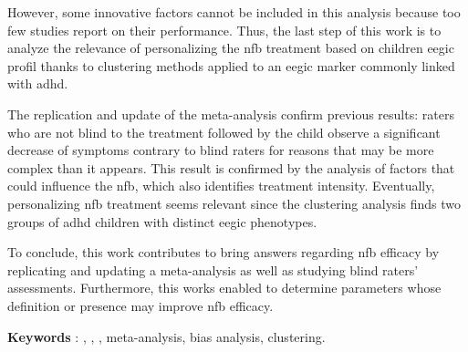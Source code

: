 However, some innovative factors cannot be included in this analysis because too few studies report on their performance.
Thus, the last step of this work is to analyze the relevance of personalizing the \gls{nfb} treatment based on children \gls{eegic} profil
thanks to clustering methods applied to an \gls{eegic} marker commonly linked with \gls{adhd}.

The replication and update of the meta-analysis confirm previous results: raters who are not blind to the treatment
followed by the child observe a significant decrease of symptoms contrary to blind raters for reasons that may be more complex 
than it appears. This result is confirmed by the analysis of factors that could influence the \gls{nfb}, which also identifies 
treatment intensity. Eventually, personalizing \gls{nfb} treatment seems relevant since the clustering analysis finds two groups
of \gls{adhd} children with distinct \gls{eegic} phenotypes. 

To conclude, this work contributes to bring answers regarding \gls{nfb} efficacy by replicating and updating a meta-analysis as well 
as studying blind raters' assessments. Furthermore, this works enabled to determine parameters whose definition or presence may improve
\gls{nfb} efficacy.

\large{\textbf{Keywords}} : , , , meta-analysis, bias analysis, clustering.